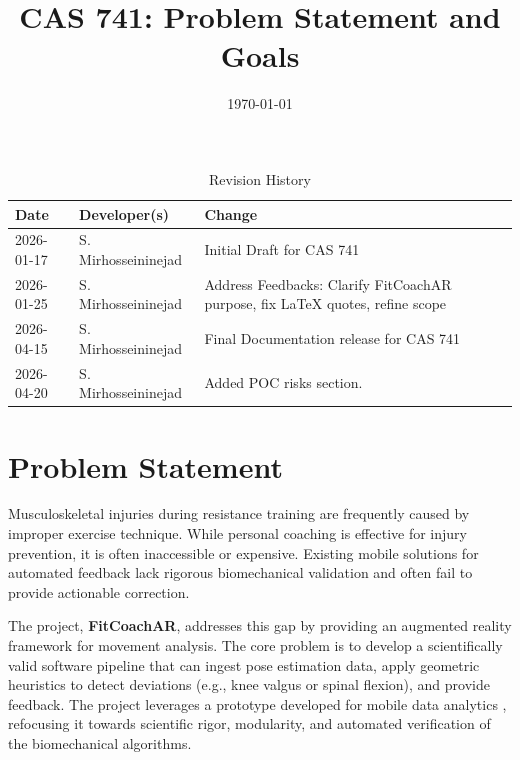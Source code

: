 \documentclass{article}
\title{CAS 741: Problem Statement and Goals\\\progname}
\author{\authname}
\date{\today}
\begin{document}
\maketitle

\begin{table}[hp]
\caption{Revision History} \label{TblRevisionHistory}
\begin{tabularx}{\textwidth}{llX}
\toprule
\textbf{Date} & \textbf{Developer(s)} & \textbf{Change}\\
\midrule
2026-01-17 & S. Mirhosseininejad & Initial Draft for CAS 741\\
2026-01-25 & S. Mirhosseininejad & Address Feedbacks: Clarify FitCoachAR purpose, fix LaTeX quotes, refine scope\\
2026-04-15 & S. Mirhosseininejad & Final Documentation release for CAS 741\\
2026-04-20 & S. Mirhosseininejad & Added POC risks section.\\
\bottomrule
\end{tabularx}
\end{table}

\section{Problem Statement}
Musculoskeletal injuries during resistance training are frequently caused by improper exercise technique. While personal coaching is effective for injury prevention, it is often inaccessible or expensive. Existing mobile solutions for automated feedback lack rigorous biomechanical validation and often fail to provide actionable correction.

The project, \textbf{FitCoachAR}, addresses this gap by providing an augmented reality framework for movement analysis. The core problem is to develop a scientifically valid software pipeline that can ingest pose estimation data, apply geometric heuristics to detect deviations (e.g., knee valgus or spinal flexion), and provide feedback. The project leverages a prototype developed for mobile data analytics \cite{1}, refocusing it towards scientific rigor, modularity, and automated verification of the biomechanical algorithms.
\end{document}
